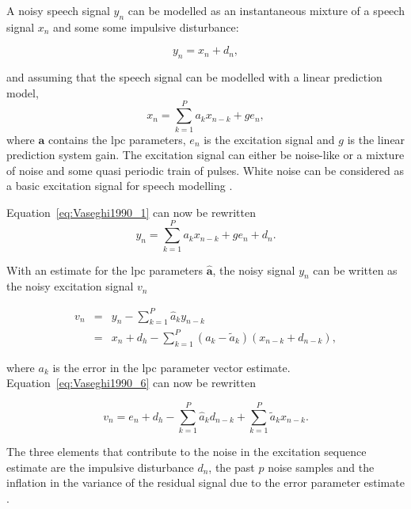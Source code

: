 A noisy speech signal $y_n$ can be modelled as an instantaneous mixture of a speech signal $x_n$ and some some impulsive disturbance:

\begin{equation}\label{eq:Vaseghi1990_1}
y_n = x_n + d_n,
\end{equation}

and assuming that the speech signal can be modelled with a linear prediction model,
\begin{equation}\label{eq:Vaseghi1990_4}
x_n = \sum^P_{k=1} a_k x_{n-k} +ge_n,
\end{equation}
where $\mathbf{a}$ contains the \gls{lpc} parameters, $e_n$ is the excitation signal and $g$ is the linear prediction system gain. The excitation signal can either be noise-like or a mixture of noise and some quasi periodic train of pulses. White noise can be considered as a basic excitation signal for speech modelling \cite{Vaseghi1990}.

Equation~\ref{eq:Vaseghi1990_1} can now be rewritten
\begin{equation}\label{eq:Vaseghi1990_5}
y_n = \sum^P_{k=1} a_k x_{n-k} + ge_n + d_n.
\end{equation}

With an estimate for the \gls{lpc} parameters $\mathbf{\hat{a}}$, the noisy signal $y_n$ can be written as the noisy excitation signal $v_n$

\begin{eqnarray}
  v_n &=& y_n - \sum^P_{k=1} \hat{a}_k y_{n-k} \nonumber\\
  &=& x_n + d_h - \sum^P_{k=1} (a_k - \tilde{a}_k)(x_{n-k} + d_{n-k}),\label{eq:Vaseghi1990_6}
\end{eqnarray}

where $a_k$ is the error in the \gls{lpc} parameter vector estimate. Equation~\ref{eq:Vaseghi1990_6} can now be rewritten

\begin{equation}\label{eq:Vaseghi1990_7}
v_n = e_n + d_h - \sum^P_{k=1} \hat{a}_k d_{n-k} + \sum^P_{k=1} \tilde{a}_k x_{n-k}.
\end{equation}

The three elements that contribute to the noise in the excitation sequence estimate are the impulsive disturbance $d_n$, the past $p$ noise samples and the inflation in the variance of the residual signal due to the error parameter estimate \cite{Vaseghi1990}.

